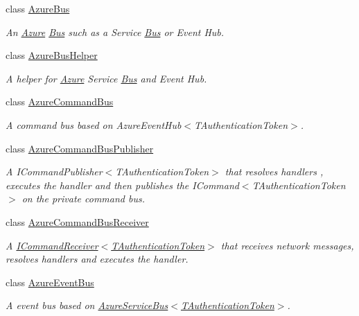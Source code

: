 \begin{DoxyCompactItemize}
\item 
class \hyperlink{classCqrs_1_1Azure_1_1ServiceBus_1_1AzureBus}{Azure\+Bus}
\begin{DoxyCompactList}\small\item\em An \hyperlink{namespaceCqrs_1_1Azure}{Azure} \hyperlink{namespaceCqrs_1_1Bus}{Bus} such as a Service \hyperlink{namespaceCqrs_1_1Bus}{Bus} or Event Hub. \end{DoxyCompactList}\item 
class \hyperlink{classCqrs_1_1Azure_1_1ServiceBus_1_1AzureBusHelper}{Azure\+Bus\+Helper}
\begin{DoxyCompactList}\small\item\em A helper for \hyperlink{namespaceCqrs_1_1Azure}{Azure} Service \hyperlink{namespaceCqrs_1_1Bus}{Bus} and Event Hub. \end{DoxyCompactList}\item 
class \hyperlink{classCqrs_1_1Azure_1_1ServiceBus_1_1AzureCommandBus}{Azure\+Command\+Bus}
\begin{DoxyCompactList}\small\item\em A command bus based on Azure\+Event\+Hub$<$\+T\+Authentication\+Token$>$. \end{DoxyCompactList}\item 
class \hyperlink{classCqrs_1_1Azure_1_1ServiceBus_1_1AzureCommandBusPublisher}{Azure\+Command\+Bus\+Publisher}
\begin{DoxyCompactList}\small\item\em A I\+Command\+Publisher$<$\+T\+Authentication\+Token$>$ that resolves handlers , executes the handler and then publishes the I\+Command$<$\+T\+Authentication\+Token$>$ on the private command bus. \end{DoxyCompactList}\item 
class \hyperlink{classCqrs_1_1Azure_1_1ServiceBus_1_1AzureCommandBusReceiver}{Azure\+Command\+Bus\+Receiver}
\begin{DoxyCompactList}\small\item\em A \hyperlink{interfaceCqrs_1_1Commands_1_1ICommandReceiver}{I\+Command\+Receiver$<$\+T\+Authentication\+Token$>$} that receives network messages, resolves handlers and executes the handler. \end{DoxyCompactList}\item 
class \hyperlink{classCqrs_1_1Azure_1_1ServiceBus_1_1AzureEventBus}{Azure\+Event\+Bus}
\begin{DoxyCompactList}\small\item\em A event bus based on \hyperlink{classCqrs_1_1Azure_1_1ServiceBus_1_1AzureServiceBus_a44845c00c29574c2fa2d43a8a6b124ca_a44845c00c29574c2fa2d43a8a6b124ca}{Azure\+Service\+Bus$<$\+T\+Authentication\+Token$>$}. \end{DoxyCompactList}\item 

\end{DoxyCompactItemize}
